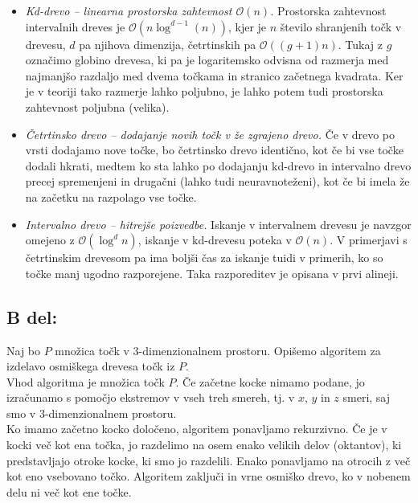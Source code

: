 \documentclass[a4paper,11pt]{article}
\begin{document}
\begin{itemize}
    \item \textit{Kd-drevo -- linearna prostorska zahtevnost $\mathcal{O}(n)$.} Prostorska zahtevnost intervalnih dreves je $\mathcal{O}(n \log^{d - 1}(n))$, kjer je $n$ število shranjenih točk v drevesu, $d$ pa njihova dimenzija, četrtinskih pa $\mathcal{O}((g + 1) n)$. Tukaj z $g$ označimo globino drevesa, ki pa je logaritemsko odvisna od razmerja med najmanjšo razdaljo med dvema točkama in stranico začetnega kvadrata. Ker je v teoriji tako razmerje lahko poljubno, je lahko potem tudi prostorska zahtevnost poljubna (velika). 
    \item \textit{Četrtinsko drevo -- dodajanje novih točk v že zgrajeno drevo.} Če v drevo po vrsti dodajamo nove točke, bo četrtinsko drevo identično, kot če bi vse točke dodali hkrati, medtem ko sta lahko po dodajanju kd-drevo in intervalno drevo precej spremenjeni in drugačni (lahko tudi neuravnoteženi), kot če bi imela že na začetku na razpolago vse točke.
    \item \textit{Intervalno drevo -- hitrejše poizvedbe.} Iskanje v intervalnem drevesu je navzgor omejeno z $\mathcal{O}(\log^d n)$, iskanje v kd-drevesu poteka v $\mathcal{O}(n)$. V primerjavi s četrtinskim drevesom pa ima boljši čas za iskanje tuidi v primerih, ko so točke manj ugodno razporejene. Taka razporeditev je opisana v prvi alineji.
\end{itemize}
    
\subsection*{B del:}
Naj bo $P$ množica točk v $3$-dimenzionalnem prostoru. Opišemo algoritem za izdelavo osmiškega drevesa točk iz $P$.
\\
Vhod algoritma je množica točk $P$. Če začetne kocke nimamo podane, jo izračunamo s pomočjo ekstremov v vseh treh smereh, tj. v $x$, $y$ in $z$ smeri, saj smo v $3$-dimenzionalnem prostoru.
\\
Ko imamo začetno kocko določeno, algoritem ponavljamo rekurzivno. 
Če je v kocki več kot ena točka, jo razdelimo na osem enako velikih delov (oktantov), ki predstavljajo otroke kocke, ki smo jo razdelili.
Enako ponavljamo na otrocih z več kot eno vsebovano točko. Algoritem zaključi in vrne osmiško drevo, ko v nobenem delu ni več kot ene točke. 





\end{document}
